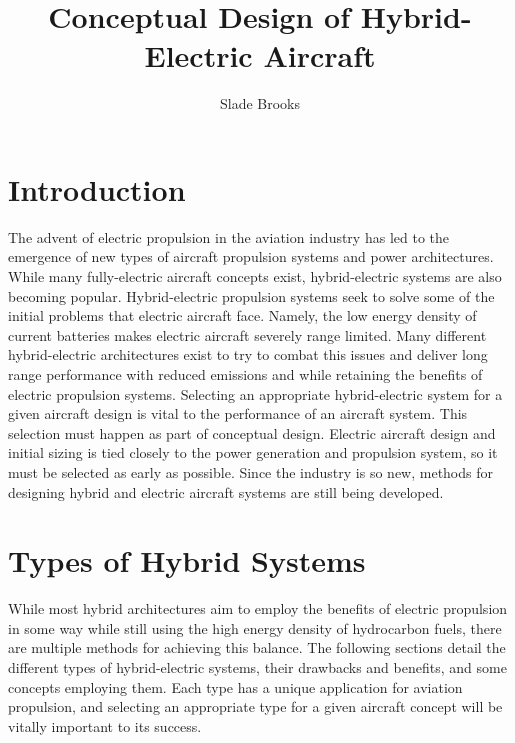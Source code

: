 \documentclass[journal]{new-aiaa}
\title{Conceptual Design of Hybrid-Electric Aircraft}
\author{Slade Brooks}
\begin{document}
\maketitle

\section{Introduction}
The advent of electric propulsion in the aviation industry has led to the emergence of new types of aircraft propulsion
systems and power architectures. While many fully-electric aircraft concepts exist, hybrid-electric systems are also
becoming popular. Hybrid-electric propulsion systems seek to solve some of the initial problems that electric aircraft
face. Namely, the low energy density of current batteries makes electric aircraft severely range limited. Many different
hybrid-electric architectures exist to try to combat this issues and deliver long range performance with reduced
emissions and while retaining the benefits of electric propulsion systems. Selecting an appropriate hybrid-electric
system for a given aircraft design is vital to the performance of an aircraft system. This selection must happen as part
of conceptual design. Electric aircraft design and initial sizing is tied closely to the power generation and propulsion
system, so it must be selected as early as possible. Since the industry is so new, methods for designing hybrid and
electric aircraft systems are still being developed.

\section{Types of Hybrid Systems}
While most hybrid architectures aim to employ the benefits of electric propulsion in some way while still using the high
energy density of hydrocarbon fuels, there are multiple methods for achieving this balance. The following sections
detail the different types of hybrid-electric systems, their drawbacks and benefits, and some concepts employing them.
Each type has a unique application for aviation propulsion, and selecting an appropriate type for a given aircraft
concept will be vitally important to its success.
\end{document}
